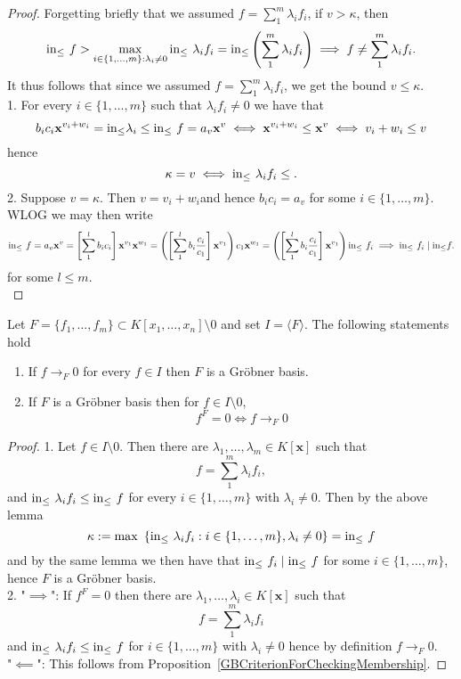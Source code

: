 \begin{proof}
    Forgetting briefly that we assumed $f=\sum_1^m \lambda_if_i$, if $v>\kappa$, then
    $$\mathrm{in}_\leq\ f > \max_{i\in\{1,\dots,m\}: \lambda_i\neq 0} \mathrm{in}_\leq\ \lambda_if_i =\mathrm{in}_\leq\left( \sum_1^m \lambda_if_i\right) \implies f\neq \sum_1^m \lambda_if_i.$$
    It thus follows that since we assumed $f=\sum_1^m\lambda_if_i$, we get the bound $v\leq \kappa$.\\
    1.
    For every $i\in\{1,\dots,m\}$ such that $\lambda_if_i\neq0 $ we have that
    $$b_ic_i\mathbf{x}^{v_i+w_i}=\mathrm{in}_\leq \lambda_i \leq \mathrm{in}_\leq\ f=a_v\mathbf{x}^v \iff \mathbf{x}^{v_i+w_i} \leq \mathbf{x}^v \iff v_i+w_i \leq v$$
    hence 
    $$\kappa = v \iff \mathrm{in}_\leq\ \lambda_if_i\leq.$$
    2. Suppose $v = \kappa$. Then $v = v_i+w_i$and hence  $b_ic_i = a_v$ for some $i\in\{1,\dots,m\}$. WLOG we may then write 
    $$\inn\ f = a_v\mathbf{x}^v = \left[\sum_1^l b_ic_i\right]\mathbf{x}^{v_1}\mathbf{x}^{w_1} = \left(\left[\sum_1^l b_i\frac{c_i}{c_1}\right]\mathbf{x}^{v_1}\right)c_1\mathbf{x}^{w_1} = \left(\left[\sum_1^l b_i\frac{c_i}{c_1}\right]\mathbf{x}^{v_1}\right)\inn\ f_i \implies \inn\ f_i \mid \inn f.$$
    for some $l\leq m.$\\
\end{proof}
\begin{lemma}\label{CriterionForCheckingSetBeingGB}
    Let $F=\{f_1,\dots,f_m\}\subset K[x_1,\dots,x_n]\setminus 0$ and set $I=\langle F\rangle$. The following statements hold
    \begin{enumerate}
        \item If $f\to_F 0$ for every $f\in I$ then $F$ is a Gröbner basis.
        \item If $F$ is a Gröbner basis then for $f\in I\setminus 0$,
    $$f^F = 0 \iff f\to_F 0 $$
    \end{enumerate}
\end{lemma}
\begin{proof}
    1. Let $f\in I\setminus 0$. Then there are $\lambda_1,\dots,\lambda_m\in K[\mathbf{x}]$ such that 
    $$f = \sum_1^m \lambda_if_i,$$
    and $\mathrm{in}_\leq\ \lambda_if_i\leq \mathrm{in}_\leq\ f$ for every $i\in\{1,\dots,m\}$ with $\lambda_i\neq0$. Then by the above lemma 
    $$\kappa:= \max\ \left\{\inn \ \lambda_if_i : i\in\{1,\dots,m\}, \lambda_i\neq0\right\} = \inn \ f$$
     and by the same lemma we then have that $\mathrm{in}_\leq\ f_i\mid \mathrm{in}_\leq\ f$ for some $i\in \{1,\dots,m\}$, hence $F$ is a Gröbner basis.\\
     2. "$\implies$": If $f^F=0$ then there are $\lambda_1,\dots,\lambda_i\in K[\mathbf{x}]$ such that 
     $$f= \sum_1^m \lambda_if_i$$
     and $\mathrm{in}_\leq\ \lambda_if_i \leq \mathrm{in}_\leq\ f$ for $i\in\{1,\dots,m\}$ with $\lambda_i\neq0$ hence by definition $f \to_F 0$.\\
     "$\impliedby$": This follows from Proposition~\ref{GBCriterionForCheckingMembership}.
\end{proof}
